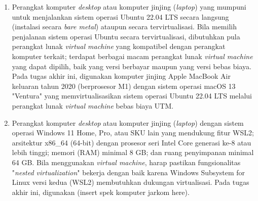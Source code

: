 \begin{enumerate}
    \item Perangkat komputer \textit{desktop} atau komputer jinjing (\textit{laptop}) yang mumpuni untuk menjalankan sistem operasi Ubuntu 22.04 LTS secara langsung (instalasi secara \textit{bare metal}) ataupun secara tervirtualisasi. Bila memilih penjalanan sistem operasi Ubuntu secara tervirtualisasi, dibutuhkan pula perangkat lunak \textit{virtual machine} yang kompatibel dengan perangkat komputer terkait; terdapat berbagai macam perangkat lunak \textit{virtual machine} yang dapat dipilih, baik yang versi berbayar maupun yang versi bebas biaya. Pada tugas akhir ini, digunakan komputer jinjing Apple MacBook Air keluaran tahun 2020 (berprosesor M1) dengan sistem operasi macOS 13 "Ventura" yang memvirtualisasikan sistem operasi Ubuntu 22.04 LTS melalui perangkat lunak \textit{virtual machine} bebas biaya UTM.
    \item Perangkat komputer \textit{desktop} atau komputer jinjing (\textit{laptop}) dengan sistem operasi Windows 11 Home, Pro, atau SKU lain yang mendukung fitur WSL2; arsitektur x86\_64 (64-bit) dengan prosesor seri Intel Core generasi ke-8 atau lebih tinggi; memori (RAM) minimal 8 GB; dan ruang penyimpanan minimal 64 GB. Bila menggunakan \textit{virtual machine}, harap pastikan fungsionalitas "\textit{nested virtualization}" bekerja dengan baik karena Windows Subsystem for Linux versi kedua (WSL2) membutuhkan dukungan virtualisasi. Pada tugas akhir ini, digunakan (insert spek komputer jarkom here).

\end{enumerate}
